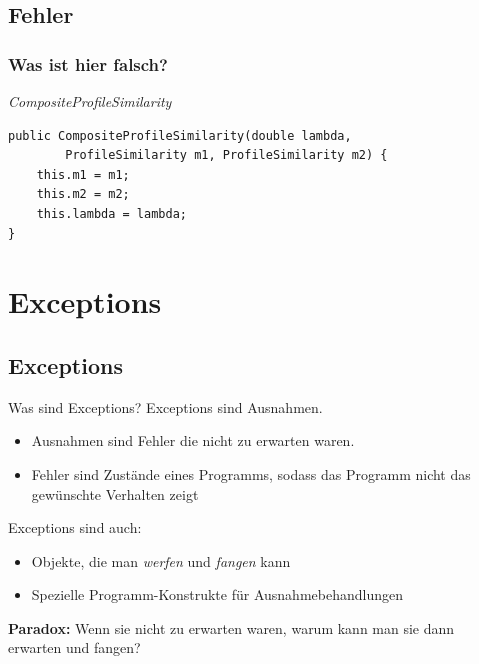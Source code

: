 \documentclass[18pt]{beamer}
\begin{document}
\subsection*{Fehler}
\begin{frame}[containsverbatim]
	\frametitle{Was ist hier falsch?}
	\emph{CompositeProfileSimilarity}
	\begin{lstlisting}
public CompositeProfileSimilarity(double lambda,
		ProfileSimilarity m1, ProfileSimilarity m2) {
	this.m1 = m1;
	this.m2 = m2;
	this.lambda = lambda;
}
	\end{lstlisting}
\end{frame}

\section{Exceptions}
\subsection*{Exceptions}
\begin{frame}{Was sind Exceptions?}
	Exceptions sind Ausnahmen.\pause
	\begin{itemize}
		\item Ausnahmen sind Fehler die nicht zu erwarten waren.\pause
		\item Fehler sind Zustände eines Programms, sodass das Programm nicht das gewünschte Verhalten zeigt
	\end{itemize}\pause
	
	Exceptions sind auch:
	\begin{itemize}
		\item Objekte, die man \emph{werfen} und \emph{fangen} kann\pause
		\item Spezielle Programm-Konstrukte für Ausnahmebehandlungen
	\end{itemize}\pause
	
	\textbf{Paradox:} Wenn sie nicht zu erwarten waren, warum kann man sie dann erwarten und fangen?
	
\end{frame}

\end{document}
